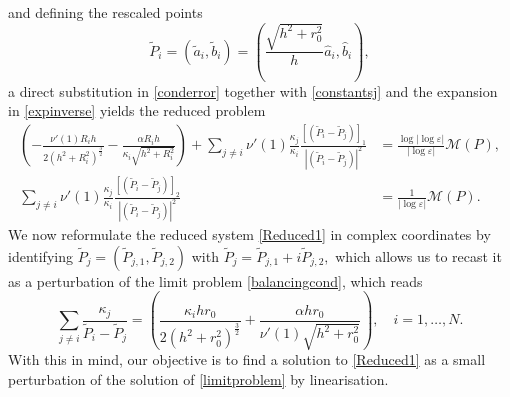 \documentclass[11pt,reqno,a4paper]{amsart}
\numberwithin{equation}{section}
\newcommand{\ve}{\varepsilon}
\begin{document}
and defining the rescaled points
\[\widetilde{P}_i=(\tilde{a}_i,\tilde{b}_i)=\left(\frac{\sqrt{h^2+r_0^2}}{h}\hat{a}_i,\hat{b}_i\right),\]
a direct substitution in \eqref{conderror} together with \eqref{constantsj} and the expansion in \eqref{expinverse} yields the reduced problem 
\begin{equation}\label{Reduced1}
\begin{aligned}
    \left(-\frac{\nu'(1)R_i h}{2(h^2+R_i^2)^{\frac 3 2}}-\frac{\alpha R_i h}{\kappa_i\sqrt{h^2+R_i^2}}\right)+\sum_{j\neq i}\nu'(1)\frac{\kappa_j}{\kappa_i}\frac{[(\widetilde{P}_i-\widetilde{P}_j)]_1}{|(\widetilde{P}_i-\widetilde{P}_j)|^2}&=\frac{\log|\log\ve|}{|\log\ve|}\mathcal{M}(P),\\
    \sum_{j\neq i}\nu'(1)\frac{\kappa_j}{\kappa_i}\frac{[(\widetilde{P}_i-\widetilde{P}_j)]_2}{|(\widetilde{P}_i-\widetilde{P}_j)|^2}&=\frac{1}{|\log\ve|}\mathcal{M}(P).
\end{aligned}
\end{equation}
We now reformulate the reduced system \eqref{Reduced1} in complex coordinates by identifying  $\widetilde{P}_j=\left(\widetilde{P}_{j,1},\widetilde{P}_{j,2}\right)$ with $\widetilde{P}_j=\widetilde{P}_{j,1}+i\widetilde{P}_{j,2},$ which allows us to recast it as a perturbation of the limit problem \eqref{balancingcond}, which reads 
\begin{equation}\label{limitproblem}
\sum_{j\neq i}\frac{\kappa_j}{\widetilde{P}_i-\widetilde{P}_j}=\left(\frac{\kappa_i h r_0}{2(h^2+r_0^2)^{\frac 3 2}}+\frac{\alpha h r_0}{\nu'(1)\sqrt{h^2+r_0^2}}\right), \quad i=1,\dots,N.
\end{equation}
With this in mind, our objective is to find a solution to \eqref{Reduced1} as a small perturbation of the solution of \eqref{limitproblem} by linearisation.
\end{document}
